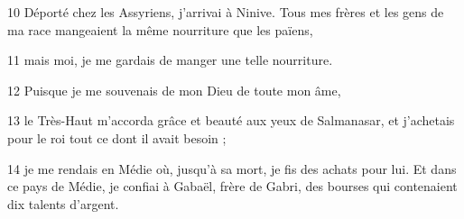 
10 Déporté chez les Assyriens, j’arrivai à Ninive. Tous mes frères et les gens de ma race mangeaient la même nourriture que les païens,

11 mais moi, je me gardais de manger une telle nourriture.

12 Puisque je me souvenais de mon Dieu de toute mon âme,

13 le Très-Haut m’accorda grâce et beauté aux yeux de Salmanasar, et j’achetais pour le roi tout ce dont il avait besoin ;

14 je me rendais en Médie où, jusqu’à sa mort, je fis des achats pour lui. Et dans ce pays de Médie, je confiai à Gabaël, frère de Gabri, des bourses qui contenaient dix talents d’argent.